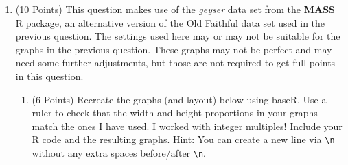 \documentclass[12pt,letterpaper,final]{article}
\begin{document}
\begin{enumerate}
\item (10 Points)
This question makes use of the {\it geyser} data set from the {\bf MASS} R package, 
an alternative version of the Old Faithful 
data set used in the previous question. The settings used here may or may not be suitable for 
the graphs in the previous question. These graphs may not be perfect and may need some
further adjustments, but those are not required to get full points in this question.


\begin{enumerate}
\item (6 Points) Recreate the graphs (and layout) below using baseR.
Use a ruler to  check that the width and height proportions in your graphs
match the ones I have used. I worked with integer multiples!
Include your R code and the resulting graphs.
Hint: You can create a new line via \verb|\n| without any extra spaces before/after \verb|\n|.


\end{enumerate}
\end{enumerate}
\end{document}
